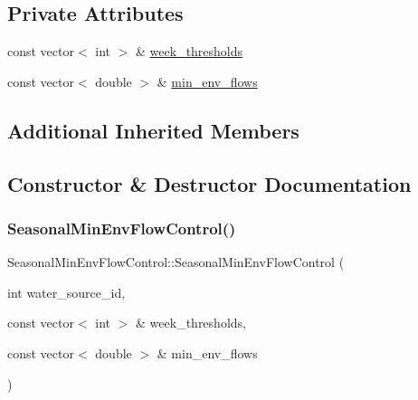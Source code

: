 \subsection*{Private Attributes}
\begin{DoxyCompactItemize}
\item 
const vector$<$ int $>$ \& \mbox{\hyperlink{classSeasonalMinEnvFlowControl_adea056def640b4e799b8549383838317_adea056def640b4e799b8549383838317}{week\+\_\+thresholds}}
\item 
const vector$<$ double $>$ \& \mbox{\hyperlink{classSeasonalMinEnvFlowControl_aa9225667157707da3230276d0de890ba_aa9225667157707da3230276d0de890ba}{min\+\_\+env\+\_\+flows}}
\end{DoxyCompactItemize}
\subsection*{Additional Inherited Members}


\subsection{Constructor \& Destructor Documentation}
\mbox{\label{classSeasonalMinEnvFlowControl_a02ea55181dd200190a6b792e57f30193_a02ea55181dd200190a6b792e57f30193}} 
\subsubsection{\texorpdfstring{Seasonal\+Min\+Env\+Flow\+Control()}{SeasonalMinEnvFlowControl()}\hspace{0.1cm}{\footnotesize\ttfamily [1/2]}}
{\footnotesize\ttfamily Seasonal\+Min\+Env\+Flow\+Control\+::\+Seasonal\+Min\+Env\+Flow\+Control (\begin{DoxyParamCaption}\item[{int}]{water\+\_\+source\+\_\+id,  }\item[{const vector$<$ int $>$ \&}]{week\+\_\+thresholds,  }\item[{const vector$<$ double $>$ \&}]{min\+\_\+env\+\_\+flows }\end{DoxyParamCaption})}


